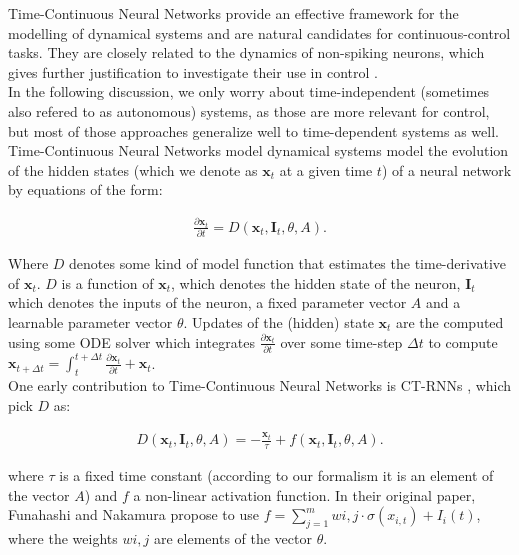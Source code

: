 Time-Continuous Neural Networks provide an effective framework for the modelling of dynamical systems \cite{Chen2018NeuralOD} and are natural candidates for continuous-control tasks. They are closely related to the dynamics of non-spiking neurons, which gives further justification to investigate their use in control \cite{Lechner2020NeuralCP}. \\

In the following discussion, we only worry about time-independent (sometimes also refered to as autonomous) systems, as those are more relevant for control, but most of those approaches generalize well to time-dependent systems as well. Time-Continuous Neural Networks model dynamical systems model the evolution of the hidden states (which we denote as $\bm{x}_t$ at a given time $t$) of a neural network by equations of the form: 

\begin{align}
    \frac{\partial \bm{x}_t}{\partial t} = D(\bm{x}_t, \bm{I}_t, \theta, A).
\end{align}
 
 Where $D$ denotes some kind of model function that estimates the time-derivative of $\bm{x}_t$. $D$ is a function of $\bm{x}_t$, which denotes the hidden state of the neuron, $\bm{I}_t$ which denotes the inputs of the neuron, a fixed parameter vector $A$ and a learnable parameter vector $\theta$. Updates of the (hidden) state $\bm{x}_t$ are the computed using some ODE solver which integrates $\frac{\partial \bm{x}_t}{\partial t}$ over some time-step $\Delta t$ to compute $\bm{x}_{t+\Delta t} = \int_t^{t+\Delta t} \frac{\partial \bm{x}_t}{\partial t} + \bm{x}_t$. \\
 
 One early contribution to Time-Continuous Neural Networks is CT-RNNs \cite{Funahashi1993ApproximationOD}, which pick $D$ as: 

\begin{align}
    D(\bm{x}_t, \bm{I}_t, \theta, A) = -\frac{\bm{x}_t}{\tau} + f(\bm{x}_t, \bm{I}_t, \theta, A).
\end{align}

where $\tau$ is a fixed time constant (according to our formalism it is an element of the vector $A$) and $f$ a non-linear activation function. In their original paper, Funahashi and Nakamura propose to use $f = \sum_{j=1}^m w{i,j} \cdot \sigma\left( x_{i,t} \right) + I_i (t)$, where the weights $w{i,j}$ are elements of the vector $\theta$. \\

